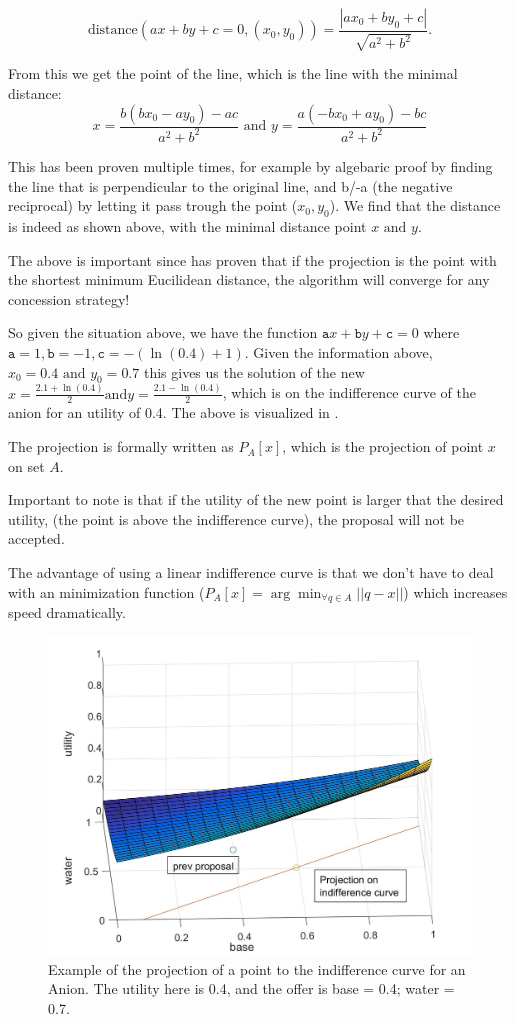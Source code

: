 \[\text{distance}(ax+by+c=0, (x_0, y_0)) = \frac{|ax_0+by_0+c|}{\sqrt{a^2+b^2}}. \]

From this we get the point of the line, which is the line with the minimal distance:
\[x = \frac{b(bx_0 - ay_0)-ac}{a^2 + b^2} \text{ and } y = \frac{a(-bx_0 + ay_0) - bc}{a^2+b^2}\]

This has been proven multiple times, for example by algebaric proof by finding the line that is perpendicular to the original line, and b/-a (the negative reciprocal) by letting it pass trough the point ($x_0, y_0$). We find that the distance is indeed as shown above, with the minimal distance point $x \text{ and }y$.

The above is important since \citet{zheng2015automated} has proven that if the projection is the point with the shortest minimum Eucilidean distance, the algorithm will converge for any concession strategy!

So given the situation above, we have the function $\texttt{a} x + \texttt{b} y + \texttt{c} = 0$ where $\texttt{a} = 1, \texttt{b} = -1, \texttt{c} = -(\ln(0.4)+1)$. Given the information above, $x_0 = 0.4 \text{ and } y_0 = 0.7$ this gives us the solution of the new $x=\frac{2.1 + \ln(0.4)}{2} \text{and} y = \frac{2.1 - \ln(0.4)}{2}$, which is on the indifference curve of the anion for an utility of 0.4.
The above is visualized in .

The projection is formally written as $P_A[x]$, which is the projection of point $x$ on set $A$. 

Important to note is that if the utility of the new point is larger that the desired utility, (the point is above the indifference curve), the proposal will not be accepted.

The advantage of using a linear indifference curve is that we don't have to deal with an minimization function ($P_A[x] = \arg \min_{\forall q \in A} ||q-x||$) which increases speed dramatically.


\begin{figure}[h]
	\centering
	\includegraphics[width=0.7\linewidth]{img/projection_anion_example}
	\caption{Example of the projection of a point to the indifference curve for an Anion. The utility here is 0.4, and the offer is base = 0.4; water = 0.7.}
	\label{fig:projectionanionexample}
\end{figure}





